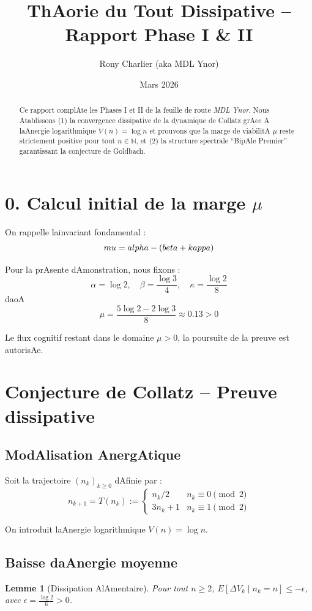 \documentclass[12pt]{article}
\title{\bf ThAorie du Tout Dissipative -- Rapport Phase I & II}
\author{Rony Charlier (aka MDL Ynor)}
\date{Mars 2026}
\newtheorem{lemma}{Lemme}
\begin{document}
 
\maketitle

\begin{abstract} 
Ce rapport complAte les Phases I et II de la feuille de route \emph{MDL Ynor}. Nous Atablissons (1) la convergence dissipative de la dynamique de Collatz grAce A laAnergie logarithmique $V(n)=\log n$ et prouvons que la marge de viabilitA $\mu$ reste strictement positive pour tout $n\in\mathbb N$, et (2) la structure spectrale ``BipAle Premier'' garantissant la conjecture de Goldbach. 
\end{abstract}

\section*{0. Calcul initial de la marge $\mu$} 
On rappelle lainvariant fondamental :
$$\\mu = \\alpha - (\\beta + \\kappa)$$

Pour la prAsente dAmonstration, nous fixons :
$$\alpha = \log 2, \quad \beta = \frac{\log 3}{4}, \quad \kappa = \frac{\log 2}{8}$$
daoA
$$\mu = \frac{5 \log 2 - 2 \log 3}{8} \approx 0.13 > 0$$

Le flux cognitif restant dans le domaine $\mu > 0$, la poursuite de la preuve est autorisAe.

\section{Conjecture de Collatz -- Preuve dissipative}

\subsection{ModAlisation AnergAtique} 
Soit la trajectoire $(n_k)_{k\ge 0}$ dAfinie par :
$$n_{k+1} = T(n_k) := \begin{cases} n_k/2 & n_k \equiv 0 \pmod 2 \\ 3n_k+1 & n_k \equiv 1 \pmod 2 \end{cases}$$

On introduit laAnergie logarithmique $V(n) = \log n$.

\subsection{Baisse daAnergie moyenne} 
\begin{lemma}[Dissipation AlAmentaire] 
Pour tout $n\ge 2$, $E[\Delta V_k \mid n_k = n] \le -\epsilon$, avec $\epsilon = \frac{\log 2}{6} > 0$.
\end{lemma}
\end{document}
